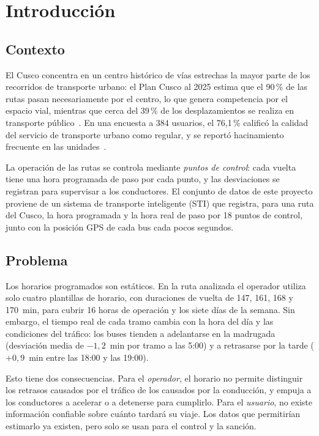 \documentclass[conference,a4paper]{IEEEtran}
\begin{document}
\section{Introducción}

\subsection{Contexto}
El Cusco concentra en un centro histórico de vías estrechas la mayor parte de los recorridos de transporte urbano: el Plan Cusco al 2025 estima que el 90\,\% de las rutas pasan necesariamente por el centro, lo que genera competencia por el espacio vial, mientras que cerca del 39\,\% de los desplazamientos se realiza en transporte público~\cite{concha2018}. En una encuesta a 384 usuarios, el 76,1\,\% calificó la calidad del servicio de transporte urbano como regular, y se reportó hacinamiento frecuente en las unidades~\cite{delgado2021}.

La operación de las rutas se controla mediante \emph{puntos de control}: cada vuelta tiene una hora programada de paso por cada punto, y las desviaciones se registran para supervisar a los conductores. El conjunto de datos de este proyecto proviene de un sistema de transporte inteligente (STI) que registra, para una ruta del Cusco, la hora programada y la hora real de paso por 18 puntos de control, junto con la posición GPS de cada bus cada pocos segundos.

\subsection{Problema}
Los horarios programados son estáticos. En la ruta analizada el operador utiliza solo cuatro plantillas de horario, con duraciones de vuelta de 147, 161, 168 y 170~min, para cubrir 16 horas de operación y los siete días de la semana. Sin embargo, el tiempo real de cada tramo cambia con la hora del día y las condiciones del tráfico: los buses tienden a adelantarse en la madrugada (desviación media de $-1{,}2$~min por tramo a las 5:00) y a retrasarse por la tarde ($+0{,}9$~min entre las 18:00 y las 19:00).

Esto tiene dos consecuencias. Para el \emph{operador}, el horario no permite distinguir los retrasos causados por el tráfico de los causados por la conducción, y empuja a los conductores a acelerar o a detenerse para cumplirlo. Para el \emph{usuario}, no existe información confiable sobre cuánto tardará su viaje. Los datos que permitirían estimarlo ya existen, pero solo se usan para el control y la sanción.
\end{document}
